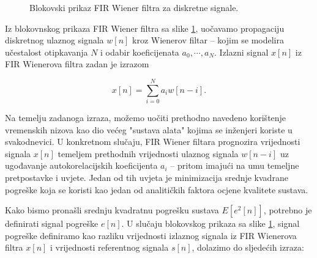 \documentclass[a4paper,12pt,oneside]{memoir}
\begin{document}
            \begin{figure}[H]
                \centering
                \caption{Blokovski prikaz FIR Wiener filtra za diskretne signale.}
                \label{fig:U5}
            \end{figure}
            Iz blokovnskog prikaza FIR Wiener filtra sa slike \ref{fig:U5}, uočavamo propagaciju diskretnog ulaznog signala $w[n]$ kroz Wienerov filtar -- kojim se modelira učestalost otipkavanja $N$ i odabir koeficijenata ${a_0,\dotsm,a_N}$. Izlazni signal $x[n]$ iz FIR Wienerova filtra zadan je izrazom

            \begin{equation}
                x[n]=\displaystyle\sum_{i=0}^{N}a_i w[n-i].
            \end{equation}

            Na temelju zadanoga izraza, možemo uočiti prethodno navedeno korištenje vremenskih nizova kao dio većeg "sustava alata" kojima se inženjeri koriste u svakodnevici. U konkretnom slučaju, FIR Wiener filtara prognozira vrijednosti signala $x[n]$ temeljem prethodnih vrijednosti ulaznog signala $w[n-i]$ uz ugođavanje autokorelacijskih koeficijenta $a_i$ -- pritom imajući na umu temeljne pretpostavke i uvjete. Jedan od tih uvjeta je minimizacija srednje kvadrane pogreške koja se koristi kao jedan od analitičkih faktora ocjene kvalitete sustava.

            Kako bismo pronašli srednju kvadratnu pogrešku sustava $E[e^2[n]]$, potrebno je definirati signal pogreške $e[n]$. U slučaju blokovskog prikaza sa slike \ref{fig:U5}, signal pogreške definiramo kao razliku vrijednosti izlaznog signala iz FIR Wienerova filtra $x[n]$ i vrijednosti referentnog signala $s[n]$, dolazimo do sljedećih izraza:
\end{document}
